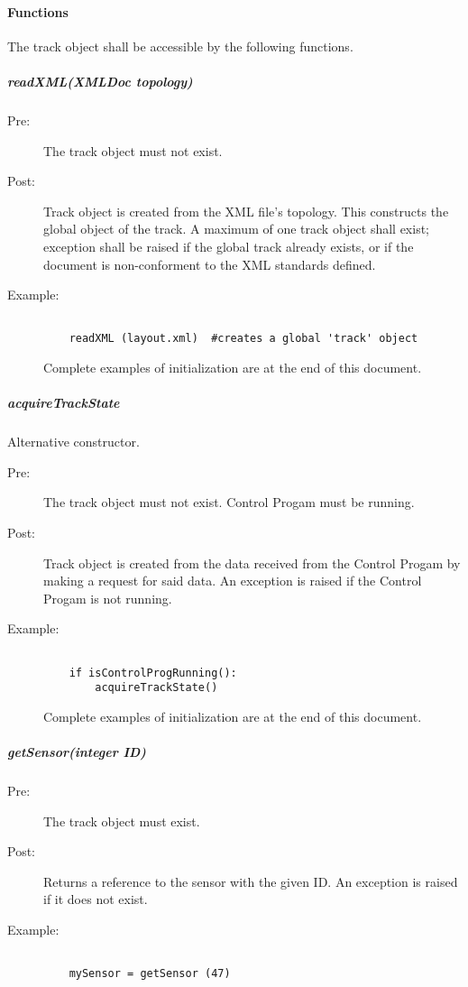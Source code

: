 \documentclass[a4paper,11pt,notitlepage]{article}
\def\CS{Control Progam\xspace}
\begin{document}
\paragraph{Functions}
The track object shall be accessible by the following functions.

\subparagraph{readXML(XMLDoc topology)}
\begin{description}
\item[\hspace{1cm}Pre:] The track object must not exist.
\item[\hspace{1cm}Post:] Track object is created from the XML file's topology. This constructs the global object of the track. A maximum of one track object shall exist; exception shall be raised if the global track already exists, or if the document is non-conforment to the XML standards defined.
\item[\hspace{1cm}Example:]
\begin{verbatim}

    readXML (layout.xml)  #creates a global 'track' object
\end{verbatim}
Complete examples of initialization are at the end of this document.
\end{description}

\subparagraph{acquireTrackState} Alternative constructor.
\begin{description}
\item[\hspace{1cm}Pre:] The track object must not exist. \CS must be running.
\item[\hspace{1cm}Post:] Track object is created from the data received from the \CS by making a request for said data. An exception is raised if the \CS is not running.
\item[\hspace{1cm}Example:]
\begin{verbatim}

    if isControlProgRunning():
        acquireTrackState()
\end{verbatim}
Complete examples of initialization are at the end of this document.
\end{description}

\subparagraph{getSensor(integer ID)}
\begin{description}
\item[\hspace{1cm}Pre:] The track object must exist.
\item[\hspace{1cm}Post:] Returns a reference to the sensor with the given ID. An exception is raised if it does not exist.
\item[\hspace{1cm}Example:]
\begin{verbatim}

    mySensor = getSensor (47)
\end{verbatim}
\end{description}
\end{document}
